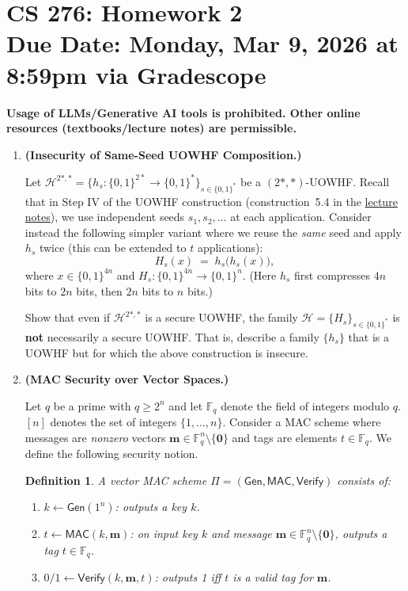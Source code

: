 \documentclass[11pt]{article}
\newtheorem{definition}[theorem]{Definition}
\numberwithin{equation}{section}
\newcommand{\duedate}{Monday, Mar 9, 2026 at 8:59pm via Gradescope}
\begin{document}
\section*{CS 276: Homework 2\\ {\small Due Date: \duedate} }
\textbf{Usage of LLMs/Generative AI tools is prohibited. Other online resources (textbooks/lecture notes) are permissible.}

\begin{enumerate}
    \item \textbf{(Insecurity of Same-Seed UOWHF Composition.)}
    
    Let $\mathcal{H}^{2*,*} = \{h_s : \{0,1\}^{2*} \to \{0,1\}^{*}\}_{s \in \{0,1\}^*}$ be a $(2*,*)$-UOWHF. Recall that in Step IV of the UOWHF construction (construction~5.4 in the \href{https://crypto-berkeley.github.io/cs276-spring26/assets/lecture-notes/notes.pdf}{lecture notes}), we use independent seeds $s_1, s_2, \dots$ at each application. Consider instead the following simpler variant where we reuse the \emph{same} seed and apply $h_s$ twice (this can be extended to $t$ applications):
    \[
        H_s(x) \;=\; h_s\!\bigl(h_s(x)\bigr),
    \]
    where $x \in \{0,1\}^{4n}$ and $H_s : \{0,1\}^{4n} \to \{0,1\}^{n}$. (Here $h_s$ first compresses $4n$ bits to $2n$ bits, then $2n$ bits to $n$ bits.)

    Show that even if $\mathcal{H}^{2*,*}$ is a secure UOWHF, the family $\mathcal{H} = \{H_s\}_{s \in \{0,1\}^*}$ is \textbf{not} necessarily a secure UOWHF. That is, describe a family $\{h_s\}$ that is a UOWHF but for which the above construction is insecure.

    

    \item \textbf{(MAC Security over Vector Spaces.)}

    Let $q$ be a prime with $q \geq 2^n$ and let $\mathbb{F}_q$ denote the field of integers modulo $q$. $[n]$ denotes the set of integers $\{1, \dots, n\}$. Consider a MAC scheme where messages are \emph{nonzero} vectors $\mathbf{m} \in \mathbb{F}_q^n \setminus \{\mathbf{0}\}$ and tags are elements $t \in \mathbb{F}_q$. We define the following security notion.

    \begin{definition}
    A \emph{vector MAC scheme} $\Pi = (\mathsf{Gen}, \mathsf{MAC}, \mathsf{Verify})$ consists of:
    \begin{enumerate}
        \item $k \leftarrow \mathsf{Gen}(1^n)$: outputs a key $k$.
        \item $t \leftarrow \mathsf{MAC}(k, \mathbf{m})$: on input key $k$ and message $\mathbf{m} \in \mathbb{F}_q^n \setminus \{\mathbf{0}\}$, outputs a tag $t \in \mathbb{F}_q$.
        \item $0/1 \leftarrow \mathsf{Verify}(k, \mathbf{m}, t)$: outputs 1 iff $t$ is a valid tag for $\mathbf{m}$.
    \end{enumerate}
    \end{definition}


\end{enumerate}
\end{document}
